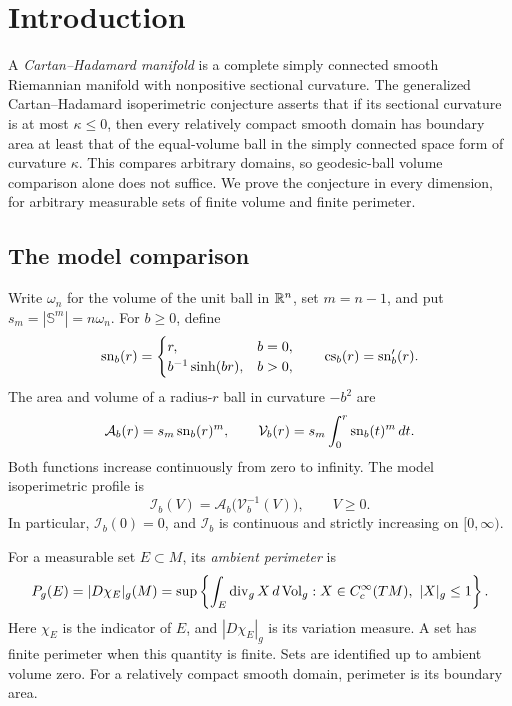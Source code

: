 \section{Introduction}\label{sec:introduction}

A \emph{Cartan--Hadamard manifold} is a complete simply connected smooth
Riemannian manifold with nonpositive sectional curvature. The generalized
Cartan--Hadamard isoperimetric conjecture asserts that if its sectional
curvature is at most $\kappa\le0$, then every relatively compact smooth
domain has boundary area at least that of the equal-volume ball in the
simply connected space form of curvature $\kappa$. This compares arbitrary
domains, so geodesic-ball volume comparison alone does not suffice.
We prove the conjecture in every dimension, for arbitrary measurable sets
of finite volume and finite perimeter.

\subsection{The model comparison}

Write $\omega_n$ for the volume of the unit ball in $\mathbb R^n$, set
$m=n-1$, and put $s_m=|\mathbb S^m|=n\omega_n$. For $b\ge0$, define
\begin{equation}\label{eq:model-functions}
 \operatorname{sn}_b(r)=
 \begin{cases}r,&b=0,\\ b^{-1}\sinh(br),&b>0,\end{cases}
 \qquad \operatorname{cs}_b(r)=\operatorname{sn}_b'(r).
\end{equation}
The area and volume of a radius-$r$ ball in curvature $-b^2$ are
\begin{equation}\label{eq:model-area-volume}
 \mathcal A_b(r)=s_m\operatorname{sn}_b(r)^m,
 \qquad
 \mathcal V_b(r)=s_m\int_0^r\operatorname{sn}_b(t)^m\,dt.
\end{equation}
Both functions increase continuously from zero to infinity. The model
isoperimetric profile is
\[
 \mathcal I_b(V)=\mathcal A_b\bigl(\mathcal V_b^{-1}(V)\bigr),
 \qquad V\ge0.
\]
In particular, $\mathcal I_b(0)=0$, and $\mathcal I_b$ is continuous
and strictly increasing on $[0,\infty)$.

For a measurable set $E\subset M$, its \emph{ambient perimeter} is
\begin{equation}\label{eq:ambient-perimeter}
 P_g(E)=|D\chi_E|_g(M)
 =\sup\left\{\int_E\operatorname{div}_g X\,d\operatorname{Vol}_g:
 X\in C_c^\infty(TM),\ |X|_g\le1\right\}.
\end{equation}
Here $\chi_E$ is the indicator of $E$, and $|D\chi_E|_g$ is its
variation measure. A set has finite perimeter when this quantity is
finite. Sets are identified up to ambient volume zero. For a relatively
compact smooth domain, perimeter is its boundary area.

